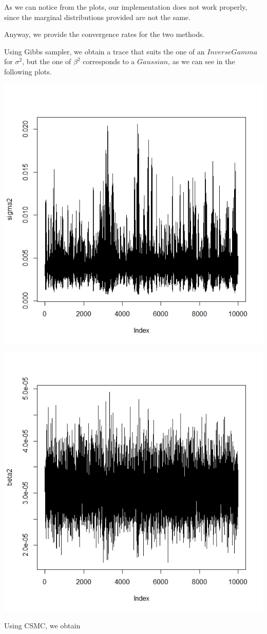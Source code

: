 \documentclass[]{article}
\begin{document}
As we can notice from the plots, our implementation does not work properly, since the marginal distributions provided are not the same. 


Anyway, we provide the convergence rates for the two methods.


Using Gibbs sampler, we obtain a trace that suits the one of an $Inverse Gamma$ for $\sigma^2$, but the one of $\beta^2$ corresponds to a $Gaussian$, as we can see in the following plots.

\begin{center}

	\includegraphics[width=.4\textwidth]{task5/Gibbs_sigma2_convergence.jpeg}

	\includegraphics[width=.4\textwidth]{task5/Gibbs_beta2_convergence.jpeg}

\end{center}


Using CSMC, we obtain
\end{document}
